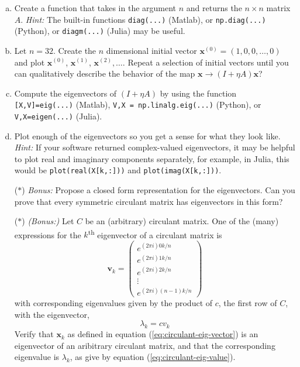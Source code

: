 \begin{enumerate}[(a)]
  \item Create a function that takes in the argument $n$ and returns the $n \times n$ matrix $A$.  \textit{Hint:} The built-in functions \texttt{diag(...)} (Matlab), or \texttt{np.diag(...)} (Python), or \texttt{diagm(...)} (Julia) may be useful.
  \item Let $n = 32$. Create the $n$ dimensional initial vector $\bm{x}^{(0)}= (1,0,0,\dots,0)$ and plot $\bm{x}^{(0)}$, $\bm{x}^{(1)}$, $\bm{x}^{(2)}, \dots $. Repeat a selection of initial vectors until you can qualitatively describe the behavior of the map $\bm{x} \to (I + \eta A)\bm{x}$? 
  \item Compute the eigenvectors of $(I+\eta A)$ by using the function \texttt{[X,V]=eig(...)} (Matlab), \texttt{V,X = np.linalg.eig(...)} (Python), or \texttt{V,X=eigen(...)} (Julia).
  \item \sloppy Plot enough of the eigenvectors so you get a sense for what they look like.\\ \textit{Hint:} If your software returned complex-valued eigenvectors, it may be helpful to plot real and imaginary components separately, for example, in Julia, this would be \texttt{plot(real(X[k,:]))} and \texttt{plot(imag(X[k,:]))}. 
  \item[($\ast$)] \textit{Bonus:} Propose a closed form representation for the eigenvectors. Can you prove that every symmetric circulant matrix has eigenvectors in this form? 
  \item[($\ast$)] \textit{(Bonus:)} Let $C$ be an (arbitrary) circulant matrix. One of the (many) expressions for the $k$\textsuperscript{th} eigenvector of a circulant matrix is 
	  \begin{equation}
		  \label{eq:circulant-eig-vector}
		  \bm{v}_k = \begin{pmatrix} e^{(2 \pi i) 0k/n}\\ e^{(2 \pi i)1k/n}\\e^{(2 \pi i) 2k/n} \\ \vdots \\ e^{( 2 \pi i) (n-1)k/n} \end{pmatrix}
		 \end{equation}
		 with corresponding eigenvalues given by the product of $c$, the first row of $C$, with the eigenvector,
		 \begin{equation}
			 \label{eq:circulant-eig-value}
			 \lambda_k = c v_k 
	\end{equation}
	Verify that $\bm{x}_k$ as defined in equation (\ref{eq:circulant-eig-vector}) is an eigenvector of an aribitrary circulant matrix, and that the corresponding eigenvalue is $\lambda_k$, as give by equation (\ref{eq:circulant-eig-value}).

\end{enumerate}
